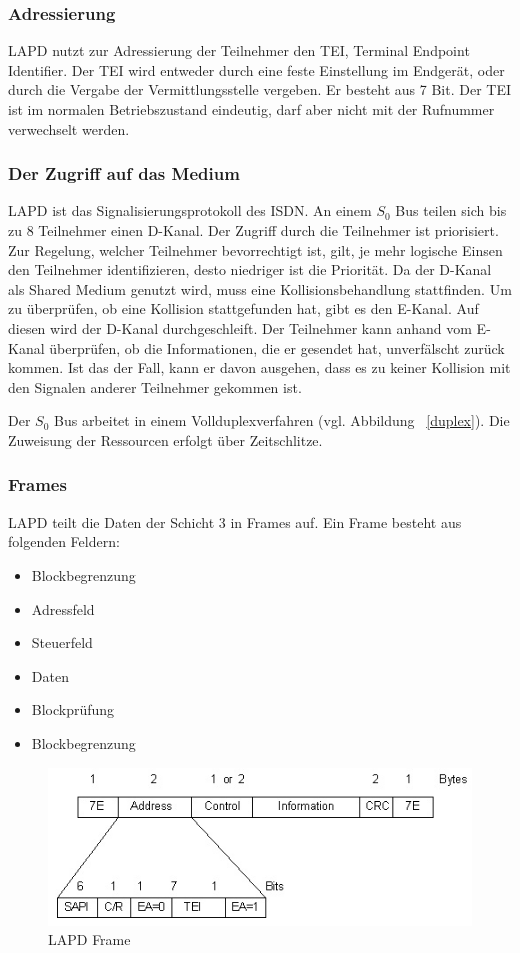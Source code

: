 \documentclass[12pt, a4paper, ngerman]{article}
\begin{document}
\subsubsection{Adressierung \label{tei}}
LAPD nutzt zur Adressierung der Teilnehmer den TEI, Terminal Endpoint Identifier. Der TEI wird entweder durch eine feste Einstellung im Endgerät, oder durch die Vergabe der Vermittlungsstelle vergeben. Er besteht aus 7 Bit. Der TEI ist im normalen Betriebszustand eindeutig, darf aber nicht mit der Rufnummer verwechselt werden.

\subsubsection{Der Zugriff auf das Medium}
LAPD ist das Signalisierungsprotokoll des ISDN. An einem $S_0$ Bus teilen sich bis zu 8 Teilnehmer einen D-Kanal. Der Zugriff durch die Teilnehmer ist priorisiert. Zur Regelung, welcher Teilnehmer bevorrechtigt ist, gilt, je mehr logische Einsen den Teilnehmer identifizieren, desto niedriger ist die Priorität. Da der D-Kanal als Shared Medium genutzt wird, muss eine Kollisionsbehandlung stattfinden. Um zu überprüfen, ob eine Kollision stattgefunden hat, gibt es den E-Kanal. Auf diesen wird der D-Kanal durchgeschleift. Der Teilnehmer kann anhand vom E-Kanal überprüfen, ob die Informationen, die er gesendet hat, unverfälscht zurück kommen. Ist das der Fall, kann er davon ausgehen, dass es zu keiner Kollision mit den Signalen anderer Teilnehmer gekommen ist.

Der $S_0$ Bus arbeitet in einem Vollduplexverfahren (vgl. Abbildung ~\ref{duplex}). Die Zuweisung der Ressourcen erfolgt über Zeitschlitze.


\subsubsection{Frames}
LAPD teilt die Daten der Schicht 3 in Frames auf. Ein Frame besteht aus folgenden Feldern:

\begin{itemize}
	\item Blockbegrenzung
	\item Adressfeld
	\item Steuerfeld
	\item Daten
	\item Blockprüfung
	\item Blockbegrenzung
\end{itemize}

\begin{figure}[H]
	\centering
	\includegraphics[width=0.9\linewidth]{Grafiken/lapd_frame.jpg}
	\caption{LAPD Frame \cite{lapd_rahmen}}
	\label{lapd_frame}
\end{figure}
\end{document}

